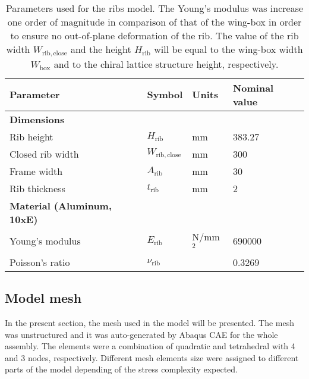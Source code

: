     \begin{table}[!htpb]
    \centering
    \begin{tabular}{|l|lll|}
    \hline
    \textbf{Parameter} & \multicolumn{1}{l|}{\textbf{Symbol}} & \multicolumn{1}{l|}{\textbf{Units}} & \textbf{Nominal value} \\ \hline \hline
    {\textbf{Dimensions}} &  &  &  \\ \hline
    Rib height & \multicolumn{1}{l|}{$H_{\mathrm{rib}}$} & \multicolumn{1}{l|}{mm} & 383.27 \\ \hline
    Closed rib width & \multicolumn{1}{l|}{$W_{\mathrm{rib,close}}$} & \multicolumn{1}{l|}{mm} & 300 \\ \hline
    Frame width & \multicolumn{1}{l|}{$A_{\mathrm{rib}}$} & \multicolumn{1}{l|}{mm} & 30 \\ \hline
    Rib thickness & \multicolumn{1}{l|}{$t_{\mathrm{rib}}$} & \multicolumn{1}{l|}{mm} & 2 \\ \hline \hline
    {\textbf{Material (Aluminum, 10xE)}} &  &  &  \\ \hline
    Young's modulus & \multicolumn{1}{l|}{$E_{\mathrm{rib}}$} & \multicolumn{1}{l|}{N/mm$^2$} & 690000 \\ \hline
    Poisson's ratio & \multicolumn{1}{l|}{$\nu_{\mathrm{rib}}$} & \multicolumn{1}{l|}{} & 0.3269 \\ \hline
    \end{tabular}
    \caption[Parameters used for the ribs model]{Parameters used for the ribs model. The Young's modulus was increase one order of magnitude in comparison of that of the wing-box in order to ensure no out-of-plane deformation of the rib. The value of the rib width $W_{\mathrm{rib,close}}$ and the height $H_{\mathrm{rib}}$ will be equal to the wing-box width $W_{\mathrm{box}}$ and to the chiral lattice structure height, respectively.}
    \label{tab:parameters_rib}
    \end{table}

  \clearpage
  \subsection{Model mesh} \label{subsec:mesh_computationalModel}

    In the present section, the mesh used in the model will be presented. The mesh was unstructured and it was auto-generated by Abaqus CAE for the whole assembly. The elements were a combination of quadratic and tetrahedral with 4 and 3 nodes, respectively. Different mesh elements size were assigned to different parts of the model depending of the stress complexity expected.

